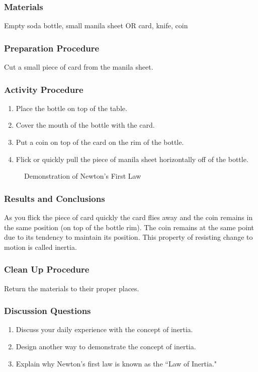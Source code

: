 \subsubsection*{Materials}
Empty soda bottle, small manila sheet OR card, knife, coin

\subsubsection*{Preparation Procedure}
Cut a small piece of card from the manila sheet.

\subsubsection*{Activity Procedure}
\begin{enumerate}
\item{Place the bottle on top of the table.} 
\item{Cover the mouth of the bottle with the card.} 
\item{Put a coin on top of the card on the rim of the bottle.} 
\item{Flick or quickly pull the piece of manila sheet horizontally off of the bottle.} 
\end{enumerate}

\begin{figure}
\begin{center}
\def\svgwidth{200pt}

\caption{Demonstration of Newton's First Law}
\label{fig:inertia}
\end{center}
\end{figure}

\subsubsection*{Results and Conclusions}
As you flick the piece of card quickly the card flies away and the coin remains in the same position (on top of the bottle rim). The coin remains at the same point due to its tendency to maintain its position. This property of resisting change to motion is called inertia.

\subsubsection*{Clean Up Procedure}
Return the materials to their proper places.

\subsubsection*{Discussion Questions}
\begin{enumerate}
\item{Discuss your daily experience with the concept of inertia.} 
\item{Design another way to demonstrate the concept of inertia.} 
\item{Explain why Newton's first law is known as the ``Law of Inertia."}
\end{enumerate}

